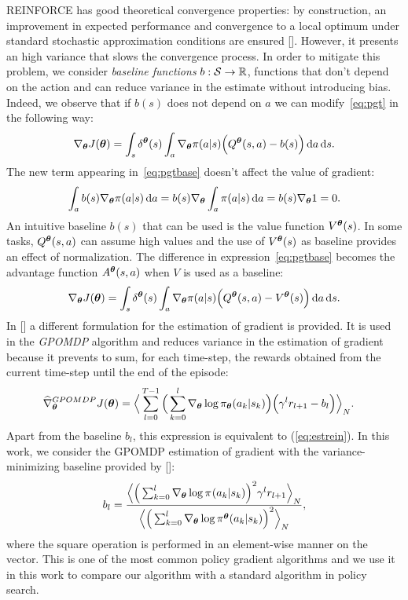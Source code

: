 \newline
REINFORCE has good theoretical convergence properties: by construction, an improvement in expected performance and convergence to a local optimum under standard stochastic approximation conditions are ensured [\cite{sutton2018reinforcement}]. However, it presents an high variance that slows the convergence process. In order to mitigate this problem, we consider \emph{baseline functions} $b: \mathcal{S} \to \mathbb{R}$, \ie functions that don't depend on the action and can reduce variance in the estimate without introducing bias.
Indeed, we observe that if $b(s)$ does not depend on $a$ we can modify~\eqref{eq:pgt} in the following way:
\begin{align} \nabla_{\boldsymbol{\theta}}J(\boldsymbol{\theta}) = \int_s \delta^{\boldsymbol{\theta}}(s) \int_a \nabla_{\boldsymbol{\theta}} \pi(a|s) \Big( Q^{\boldsymbol{\theta}}(s,a) -b(s) \Big) \,\mathrm{d} a \,\mathrm{d} s. \label{eq:pgtbase}\end{align}
The new term appearing in~\eqref{eq:pgtbase} doesn't affect the value of gradient:
\begin{align} \int_a b(s) \nabla_{\boldsymbol{\theta}} \pi(a|s) \,\mathrm{d} a = b(s) \nabla_{\boldsymbol{\theta}} \int_a \pi(a|s) \,\mathrm{d} a = b(s) \nabla_{\boldsymbol{\theta}} 1 = 0. \end{align}
An intuitive baseline $b(s)$ that can be used is the value function $V^{\boldsymbol{\theta}}(s)$. In some tasks, $Q^{\boldsymbol{\theta}}(s,a)$ can assume high values and the use of $V^{\boldsymbol{\theta}}(s)$ as baseline provides an effect of normalization. The difference in expression~\eqref{eq:pgtbase} becomes the advantage function $A^{\boldsymbol{\theta}}(s,a)$ when $V$ is used as a baseline:
\begin{align} \nabla_{\boldsymbol{\theta}}J(\boldsymbol{\theta}) = \int_s \delta^{\boldsymbol{\theta}}(s) \int_a \nabla_{\boldsymbol{\theta}} \pi(a|s) \Big( Q^{\boldsymbol{\theta}}(s,a) - V^{\boldsymbol{\theta}}(s) \Big) \,\mathrm{d} a \,\mathrm{d} s.\end{align}
In [\cite{Peters2008ReinforcementLO}] a different formulation for the estimation of gradient is provided. It is used in the \emph{GPOMDP} algorithm and reduces variance in the estimation of gradient because it prevents to sum, for each time-step, the rewards obtained from the current time-step until the end of the episode:
\begin{align}
\widehat{\nabla}_{\boldsymbol{\theta}}^{GPOMDP}J(\boldsymbol{\theta}) &= \Big\langle \sum_{l=0}^{T-1} \Big( \sum_{k=0}^{l} \nabla_{\boldsymbol{\theta}}\log\pi_{\boldsymbol{\theta}}(a_k|s_k)\Big)\Big(\gamma^{l}r_{l+1} - b_{l} \Big)  \Big\rangle_{N}.
\end{align}
Apart from the baseline $b_l$, this expression is equivalent to (\ref{eq:estrein}). In this work, we consider the GPOMDP estimation of gradient with the variance-minimizing baseline provided by [\cite{Peters2008ReinforcementLO}]:
\begin{align} b_l = \frac{\Big\langle\Big( \sum_{k=0}^{l}\nabla_{\boldsymbol{\theta}} \log\pi^{}(a_k|s_k)\Big)^2 \gamma^{l}r_{l+1}\Big\rangle_{N}} {\Big\langle\Big( \sum_{k=0}^{l}\nabla_{\boldsymbol{\theta}} \log\pi^{\boldsymbol{\theta}}(a_k|s_k)\Big)^2\Big\rangle_{N}},
\end{align}
where the square operation is performed in an element-wise manner on the vector.
This is one of the most common policy gradient algorithms and we use it in this work to compare our algorithm with a standard algorithm in policy search.

